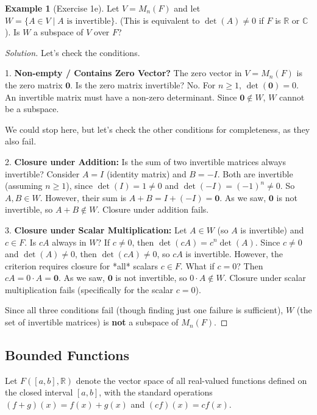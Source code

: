\documentclass[11pt]{article}
\theoremstyle{definition}
\newtheorem{example}[theorem]{Example}
\theoremstyle{remark}
\newcommand{\zerovec}{\mathbf{0}}
\begin{document}
\begin{example}[Exercise 1e]
Let $V = M_n(F)$ and let $W = \{ A \in V \mid A \text{ is invertible} \}$. (This is equivalent to $\det(A) \neq 0$ if $F$ is $\mathbb{R}$ or $\mathbb{C}$). Is $W$ a subspace of $V$ over $F$?

\begin{proof}[Solution]
Let's check the conditions.

1.  \textbf{Non-empty / Contains Zero Vector?} The zero vector in $V = M_n(F)$ is the zero matrix $\zerovec$. Is the zero matrix invertible? No. For $n \ge 1$, $\det(\zerovec) = 0$. An invertible matrix must have a non-zero determinant. Since $\zerovec \notin W$, $W$ cannot be a subspace.

We could stop here, but let's check the other conditions for completeness, as they also fail.

2.  \textbf{Closure under Addition:} Is the sum of two invertible matrices always invertible? Consider $A = I$ (identity matrix) and $B = -I$. Both are invertible (assuming $n \ge 1$), since $\det(I)=1 \neq 0$ and $\det(-I) = (-1)^n \neq 0$. So $A, B \in W$.
    However, their sum is $A+B = I + (-I) = \zerovec$. As we saw, $\zerovec$ is not invertible, so $A+B \notin W$. Closure under addition fails.

3.  \textbf{Closure under Scalar Multiplication:} Let $A \in W$ (so $A$ is invertible) and $c \in F$. Is $cA$ always in $W$? If $c \neq 0$, then $\det(cA) = c^n \det(A)$. Since $c \neq 0$ and $\det(A) \neq 0$, then $\det(cA) \neq 0$, so $cA$ is invertible.
    However, the criterion requires closure for *all* scalars $c \in F$. What if $c=0$? Then $c A = 0 \cdot A = \zerovec$. As we saw, $\zerovec$ is not invertible, so $0 \cdot A \notin W$. Closure under scalar multiplication fails (specifically for the scalar $c=0$).

Since all three conditions fail (though finding just one failure is sufficient), $W$ (the set of invertible matrices) is \textbf{not} a subspace of $M_n(F)$.
\end{proof}
\end{example}

\subsection{Bounded Functions}

Let $F([a, b], \mathbb{R})$ denote the vector space of all real-valued functions defined on the closed interval $[a, b]$, with the standard operations $(f+g)(x) = f(x) + g(x)$ and $(cf)(x) = c f(x)$.
\end{document}
